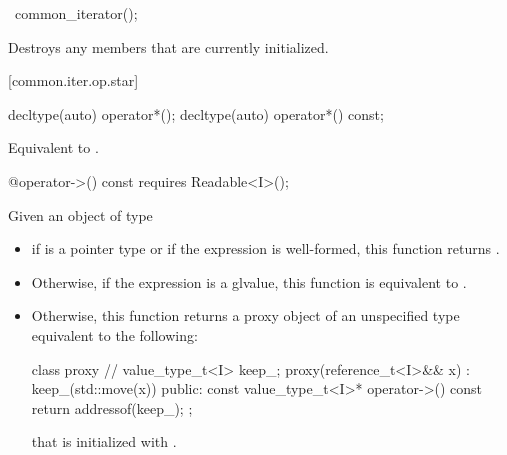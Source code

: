 \begin{addedblock}
\begin{itemdescr}
\pnum
\returns {}
\end{itemdescr}

%
\begin{itemdecl}
~common_iterator();
\end{itemdecl}

\begin{itemdescr}
\pnum
\effects
Destroys any members that are currently initialized.
\end{itemdescr}

[common.iter.op.star]{}

%
%
\begin{itemdecl}
decltype(auto) operator*();
decltype(auto) operator*() const;
\end{itemdecl}

\begin{itemdescr}
\pnum
\requires {}

\pnum
\effects Equivalent to .
\end{itemdescr}

%
%
\begin{itemdecl}
@\seebelow@ operator->() const requires Readable<I>();
\end{itemdecl}

\begin{itemdescr}
\pnum
\requires {}

\pnum
\effects Given an object  of type 
\begin{itemize}
\item if  is a pointer type or if the expression
       is well-formed, this function returns
      .
\item Otherwise, if the expression  is a glvalue, this function
      is equivalent to .
\item Otherwise, this function returns a proxy object of an unspecified type
      equivalent to the following:
      \begin{codeblock}
      class proxy {               // \expos
        value_type_t<I> keep_;
        proxy(reference_t<I>&& x)
          : keep_(std::move(x)) {}
      public:
        const value_type_t<I>* operator->() const {
          return addressof(keep_);
        }
      };
      \end{codeblock}
      that is initialized with .
\end{itemize}
\end{itemdescr}



\end{addedblock}
